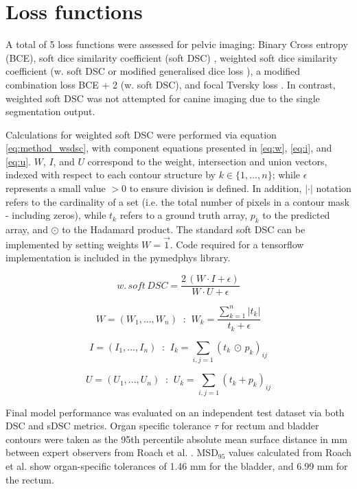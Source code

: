 \section{Loss functions}
\label{ch:method-loss}
A total of 5 loss functions were assessed for pelvic imaging: Binary Cross entropy (BCE), soft dice similarity coefficient (soft DSC) \cite{Bertels2019}, weighted soft dice similarity coefficient (w. soft DSC or modified generalised dice loss \cite{Sudre_2017}), a modified combination loss BCE + 2 (w. soft DSC), and focal Tversky loss \cite{Zhu_2018, Khan2019, abraham2018}. In contrast, weighted soft DSC was not attempted for canine imaging due to the single segmentation output.

Calculations for weighted soft DSC were performed via equation \ref{eq:method_wsdsc}, with component equations presented in \ref{eq:w}, \ref{eq:i}, and \ref{eq:u}. $W$, $I$, and $U$ correspond to the weight, intersection and union vectors, indexed with respect to each contour structure by $k\in\{1,...,n\}$; while $\epsilon$ represents a small value $>0$ to ensure division is defined. In addition, $|\cdot|$ notation refers to the cardinality of a set (i.e. the total number of pixels in a contour mask - including zeros), while $t_{k}$ refers to a ground truth array, $p_{k}$ to the predicted array, and $\odot$ to the Hadamard product. The standard soft DSC can be implemented by setting weights $W=\vec{1}$.  Code required for a tensorflow implementation is included in the pymedphys library.

\begin{equation}
w. \, soft \, DSC = \frac{2 \, (W \cdot I + \epsilon)}{W \cdot U + \epsilon}
\label{eq:method_wsdsc}
\end{equation}

\begin{equation}
W = (W_{1}, ..., W_{n}) \; \; \textbf{:} \; \; W_{k} = \frac{\sum_{k=1}^{n} |t_{k} |}{t_{k} + \epsilon}
\label{eq:w}
\end{equation}

\begin{equation}
I = (I_{1}, ..., I_{n}) \; \; \textbf{:} \; \; I_{k} = \sum_{i,j=1}(t_{k} \, \odot \,  p_{k})_{ij}
\label{eq:i}
\end{equation}

\begin{equation}
U = (U_{1}, ..., U_{n}) \; \; \textbf{:} \; \; U_{k} =  \sum_{i,j=1}(t_{k} + p_{k})_{ij}
\label{eq:u}
\end{equation}


Final model performance was evaluated on an independent test dataset via both DSC and sDSC metrics. Organ specific tolerance $\tau$ for rectum and bladder contours were taken as the 95th percentile absolute mean surface distance in mm between expert observers from Roach et al. \cite{Roach_2019}. MSD$_{95}$ values calculated from Roach et al. show organ-specific tolerances of 1.46 mm for the bladder, and 6.99 mm for the rectum.